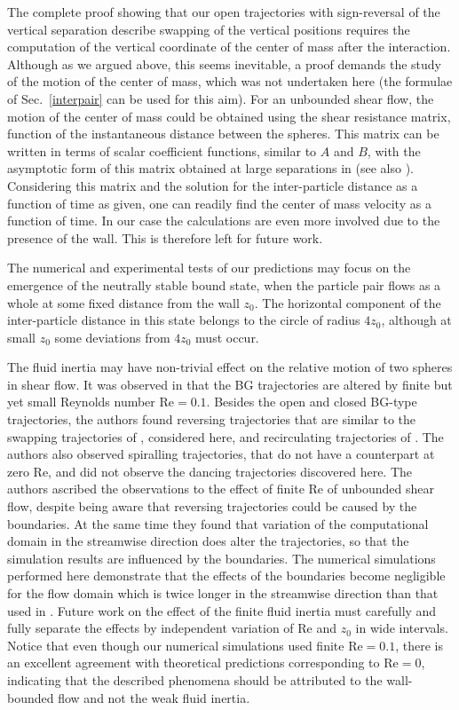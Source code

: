 The complete proof showing that our open trajectories with sign-reversal of the vertical separation describe swapping of the vertical positions
requires the computation of the vertical coordinate of the center of mass after the interaction.
 Although as we argued above, this seems inevitable,  a proof demands the study of the motion of the center of mass, which was not undertaken here (the formulae of Sec.~\ref{interpair} can be used for this aim). For an unbounded shear flow, the motion of the center of mass could be obtained using the shear resistance matrix, function of
 the instantaneous distance between the spheres. This matrix can be written in terms of scalar coefficient functions, similar to $A$ and $B$, with the asymptotic form of this matrix  obtained at large separations in \cite{sh} (see also \cite{arp}). Considering this matrix
and the solution for the inter-particle distance as a function of time as given, one can readily find the center of mass velocity as a function of time. In our case the calculations are even more involved due to the presence of the wall. This is therefore left for future work.

The numerical and experimental tests of our predictions may focus on the emergence of the neutrally stable bound state, when the particle pair flows as a whole
at some fixed distance from the wall $z_0$. The horizontal component of the inter-particle distance in this state belongs to the circle of radius $4 z_0$, although at small $z_0$ some deviations from $4 z_0$ must occur.

The fluid inertia may have non-trivial effect on the relative motion of two spheres in shear flow. It was observed in \cite{km} that the BG trajectories are altered by finite but yet small Reynolds number $\mathrm{Re}=0.1$. Besides the open and closed BG-type trajectories, the authors found reversing trajectories that are similar to the swapping trajectories of \cite{zurita-gotor_2007}, considered here, and recirculating trajectories of \cite{sk}. The authors also observed spiralling trajectories, that do not have a counterpart at zero Re, and did not observe the dancing trajectories discovered here. The authors ascribed the observations to the effect of finite Re of unbounded shear flow, despite being aware that reversing trajectories could be caused by the boundaries. At the same time they found that variation of the computational domain in the streamwise direction does alter the trajectories, so that the simulation results are influenced by the boundaries. The numerical simulations performed here demonstrate that the effects of the boundaries become negligible for the flow domain which is twice longer in the streamwise direction than that used in \cite{km}. Future work on the effect of the finite fluid inertia must carefully and fully separate the effects by independent variation of Re and $z_0$ in wide intervals. Notice that even though our numerical simulations used finite $\mathrm{Re}=0.1$, there is an excellent agreement with theoretical predictions corresponding to $\mathrm{Re}=0$, indicating that the described phenomena should be attributed to the wall-bounded flow and not the weak fluid inertia.

